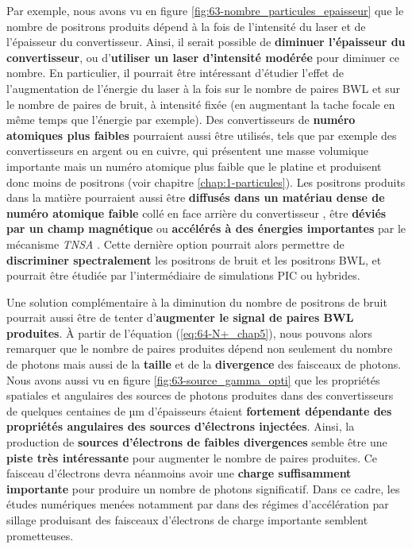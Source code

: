 \begin{refsection}
Par exemple, nous avons vu en figure \ref{fig:63-nombre_particules_epaisseur} que le nombre de positrons produits dépend à la fois de l'intensité du laser et de l'épaisseur du convertisseur. Ainsi, il serait possible de \textbf{diminuer l'épaisseur du convertisseur}, ou d'\textbf{utiliser un laser d'intensité modérée} pour diminuer ce nombre. En particulier, il pourrait être intéressant d'étudier l'effet de l'augmentation de l'énergie du laser à la fois sur le nombre de paires BWL et sur le nombre de paires de bruit, à intensité fixée (en augmentant la tache focale en même temps que l'énergie par exemple). Des convertisseurs de \textbf{numéro atomiques plus faibles} pourraient aussi être utilisés, tels que par exemple des convertisseurs en argent ou en cuivre, qui présentent une masse volumique importante mais un numéro atomique plus faible que le platine et produisent donc moins de positrons (voir chapitre \ref{chap:1-particules}).
Les positrons produits dans la matière pourraient aussi être \textbf{diffusés dans un matériau dense de numéro atomique faible} collé en face arrière du convertisseur \parencite{glinec_2005}, être \textbf{déviés par un champ magnétique} \parencite{ribeyre_2016} ou \textbf{accélérés à des énergies importantes} par le mécanisme \textit{TNSA} \parencite{chen_2010a}. Cette dernière option pourrait alors permettre de \textbf{discriminer spectralement} les positrons de bruit et les positrons BWL, et pourrait être étudiée par l'intermédiaire de simulations PIC ou hybrides. 

Une solution complémentaire à la diminution du nombre de positrons de bruit pourrait aussi être de tenter d'\textbf{augmenter le signal de paires BWL produites}. À partir de l'équation (\ref{eq:64-N+_chap5}), nous pouvons alors remarquer que le nombre de paires produites dépend non seulement du nombre de photons mais aussi de la \textbf{taille} et de la \textbf{divergence} des faisceaux de photons. Nous avons aussi vu en figure \ref{fig:63-source_gamma_opti} que les propriétés spatiales et angulaires des sources de photons produites dans des convertisseurs de quelques centaines de µm d'épaisseurs étaient \textbf{fortement dépendante des propriétés angulaires des sources d'électrons injectées}. Ainsi, la production de \textbf{sources d'électrons de faibles divergences} semble être une \textbf{piste très intéressante} pour augmenter le nombre de paires produites. 
Ce faisceau d'électrons devra néanmoins avoir une \textbf{charge suffisamment importante} pour produire un nombre de photons significatif. Dans ce cadre, les études numériques menées notamment par \cite{lobok_2019} dans des régimes d'accélération par sillage produisant des faisceaux d'électrons de charge importante semblent prometteuses. 


\end{refsection}
